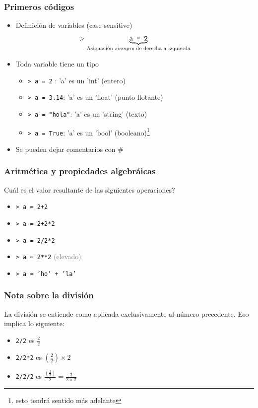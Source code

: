 \documentclass[14pt,aspectratio=169,xcolor=dvipsnames]{beamer}
\begin{document}
\begin{frame}[t]\frametitle{Primeros códigos}
    \begin{itemize}
        \item Definición de variables (case sensitive)
            $$ > \underbrace{\texttt{a = 2}}_\text{Asignación \emph{siempre} de derecha a izquierda} $$
        \item Toda variable tiene un tipo 
            \begin{itemize}
                \item \texttt{> a = 2} : \hspace{0.3cm}\>\>\>\>\> 'a' es un 'int' (entero)
                \item \texttt{> a = 3.14}: \>\>\>\>\>'a' es un 'float' (punto flotante)
                \item \texttt{> a = "hola"}: 'a' es un 'string' (texto)
                \item \texttt{> a = True}: \>\>\> 'a' es un 'bool' (booleano)\footnote{esto tendrá sentido más adelante}
            \end{itemize}
        \item Se pueden dejar comentarios con \#
    \end{itemize}

\end{frame}
\begin{frame}\frametitle{Aritmética y propiedades algebráicas}
Cuál es el valor resultante de las siguientes operaciones? 

\vspace{1cm}
    \begin{itemize}
        \item \texttt{> a = 2+2}
        \item \texttt{> a = 2+2*2}
        \item \texttt{> a = 2/2*2}
        \item \texttt{> a = 2**2}   \textcolor{gray}{(elevado)}
        \item \texttt{> a = 'ho' + 'la'}
    \end{itemize}


\end{frame}
\begin{frame}\frametitle{Nota sobre la división}
La división se entiende como aplicada exclusivamente al número precedente. Eso implica lo siguiente: 
    \begin{itemize}
        \item \texttt{2/2} es $\frac 2 2$
        \item \texttt{2/2*2} es $\left(\frac 2 2\right) \times 2$
        \item \texttt{2/2/2} es $\frac{\left(\frac 2 2\right)}{2}= \frac{2}{2\times 2}$
    \end{itemize}

\pause {}
\end{frame}
\end{document}
